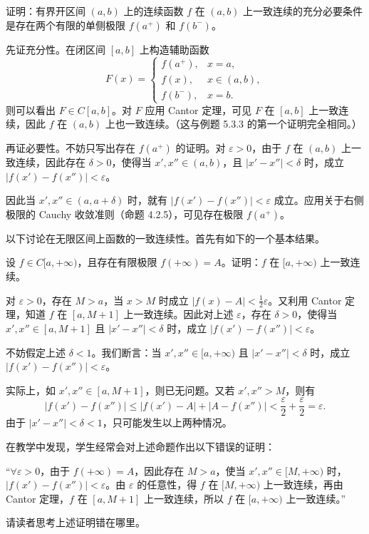 \begin{xexample}[5.4.5]
证明：有界开区间 $(a,b)$ 上的连续函数 $f$ 在 $(a,b)$ 上一致连续的充分必要条件是存在两个有限的单侧极限 $f(a^+)$ 和 $f(b^-)$。
\end{xexample}
\begin{xproof}
先证充分性。在闭区间 $[a,b]$ 上构造辅助函数
\[
  F(x)=\begin{cases}
    f(a^+),&x=a,\\
    f(x),&x\in(a,b),\\
    f(b^-),&x=b.
  \end{cases}
\]
则可以看出 $F\in C[a,b]$。对 $F$ 应用 Cantor 定理，可见 $F$ 在 $[a,b]$ 上一致连续，因此 $f$ 在 $(a,b)$ 上也一致连续。（这与例题 5.3.3 的第一个证明完全相同。）

再证必要性。不妨只写出存在 $f(a^+)$ 的证明。对 $\varepsilon>0$，由于 $f$ 在 $(a,b)$ 上一致连续，因此存在 $\delta>0$，使得当 $x',x''\in(a,b)$，且 $|x'-x''|<\delta$ 时，成立 $|f(x')-f(x'')|<\varepsilon$。

因此当 $x',x''\in(a,a+\delta)$ 时，就有 $|f(x')-f(x'')|<\varepsilon$ 成立。应用关于右侧极限的 Cauchy 收敛准则（命题 4.2.5），可见存在极限 $f(a^+)$。
\end{xproof}

以下讨论在无限区间上函数的一致连续性。首先有如下的一个基本结果。

\begin{xexample}[5.4.6]
设 $f\in C[a,+\infty)$，且存在有限极限 $f(+\infty)=A$。证明：$f$ 在 $[a,+\infty)$ 上一致连续。
\end{xexample}
\begin{xproof}
对 $\varepsilon>0$，存在 $M>a$，当 $x>M$ 时成立 $|f(x)-A|<\frac12\varepsilon$。又利用 Cantor 定理，知道 $f$ 在 $[a,M+1]$ 上一致连续。因此对上述 $\varepsilon$，存在 $\delta>0$，使得当 $x',x''\in[a,M+1]$ 且 $|x'-x''|<\delta$ 时，成立 $|f(x')-f(x'')|<\varepsilon$。

不妨假定上述 $\delta<1$。我们断言：当 $x',x''\in[a,+\infty)$ 且 $|x'-x''|<\delta$ 时，成立 $|f(x')-f(x'')|<\varepsilon$。

实际上，如 $x',x''\in[a,M+1]$，则已无问题。又若 $x',x''>M$，则有
\[
  |f(x')-f(x'')|\le|f(x')-A|+|A-f(x'')|<\frac\varepsilon2+\frac\varepsilon2=\varepsilon.
\]
由于 $|x'-x''|<\delta<1$，只可能发生以上两种情况。
\end{xproof}

\begin{xremark}
在教学中发现，学生经常会对上述命题作出以下错误的证明：

“$\forall\varepsilon>0$，由于 $f(+\infty)=A$，因此存在 $M>a$，使当 $x',x''\in[M,+\infty)$ 时，$|f(x')-f(x'')|<\varepsilon$。由 $\varepsilon$ 的任意性，得 $f$ 在 $[M,+\infty)$ 上一致连续，再由 Cantor 定理，$f$ 在 $[a,M+1]$ 上一致连续，所以 $f$ 在 $[a,+\infty)$ 上一致连续。”

请读者思考上述证明错在哪里。
\end{xremark}

